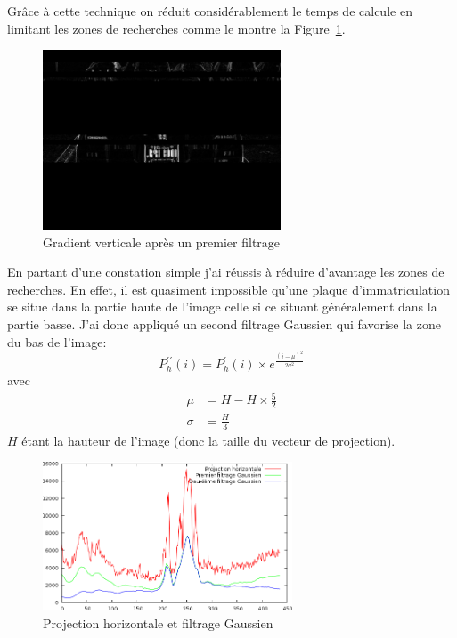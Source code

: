\documentclass[a4paper,10pt,twocolumn]{article}
\begin{document}
Grâce à cette technique on réduit considérablement le temps de calcule en limitant les zones de recherches comme le montre la Figure~\ref{v_filter}.
\begin{figure}[H]
	\centering 
	  \includegraphics[width=200pt]{img/991213-006_v_filter_1-2.png}
	\caption{Gradient verticale après un premier filtrage\label{v_filter}}
\end{figure}
En partant d'une constation simple j'ai réussis à réduire d'avantage les zones de recherches. En effet, il est quasiment impossible qu'une plaque d'immatriculation se situe dans la partie haute de l'image celle si ce situant généralement dans la partie basse. J'ai donc appliqué un second filtrage Gaussien qui favorise la zone du bas de l'image:
\begin{equation}
  P_h^{\prime\prime}(i) = P_h^{\prime}(i) \times e^{\frac{(i - \mu)^2}{2\sigma^2}}
\end{equation}
avec 
\begin{align*}
  \mu & = H - H\times \frac{5}{2}\\
  \sigma & = \frac{H}{3}
\end{align*}
$H$ étant la hauteur de l'image (donc la taille du vecteur de projection).

\begin{figure}[H]
	\centering 
	  \includegraphics[width=210pt]{img/project_h_gauss.png}
	\caption{Projection horizontale et filtrage Gaussien\label{h_proj_gauss}}
\end{figure}
\end{document}
